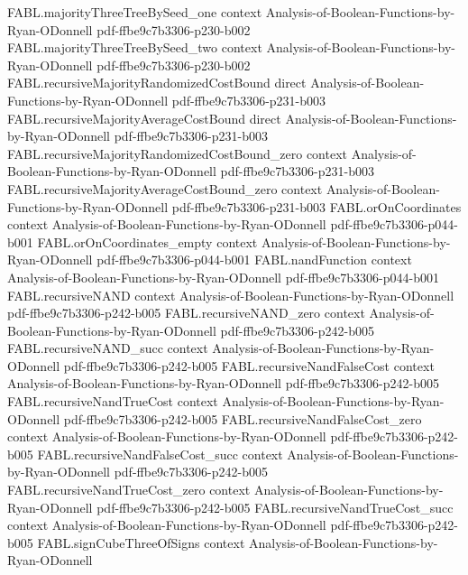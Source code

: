\begin{theorem}
  {FABL.majorityThreeTreeBySeed_one}
  {context}
  {Analysis-of-Boolean-Functions-by-Ryan-ODonnell}
  {pdf-ffbe9c7b3306-p230-b002}
\proofstep
  {FABL.majorityThreeTreeBySeed_two}
  {context}
  {Analysis-of-Boolean-Functions-by-Ryan-ODonnell}
  {pdf-ffbe9c7b3306-p230-b002}
\proofstep
  {FABL.recursiveMajorityRandomizedCostBound}
  {direct}
  {Analysis-of-Boolean-Functions-by-Ryan-ODonnell}
  {pdf-ffbe9c7b3306-p231-b003}
\proofstep
  {FABL.recursiveMajorityAverageCostBound}
  {direct}
  {Analysis-of-Boolean-Functions-by-Ryan-ODonnell}
  {pdf-ffbe9c7b3306-p231-b003}
\proofstep
  {FABL.recursiveMajorityRandomizedCostBound_zero}
  {context}
  {Analysis-of-Boolean-Functions-by-Ryan-ODonnell}
  {pdf-ffbe9c7b3306-p231-b003}
\proofstep
  {FABL.recursiveMajorityAverageCostBound_zero}
  {context}
  {Analysis-of-Boolean-Functions-by-Ryan-ODonnell}
  {pdf-ffbe9c7b3306-p231-b003}
\proofstep
  {FABL.orOnCoordinates}
  {context}
  {Analysis-of-Boolean-Functions-by-Ryan-ODonnell}
  {pdf-ffbe9c7b3306-p044-b001}
\proofstep
  {FABL.orOnCoordinates_empty}
  {context}
  {Analysis-of-Boolean-Functions-by-Ryan-ODonnell}
  {pdf-ffbe9c7b3306-p044-b001}
\proofstep
  {FABL.nandFunction}
  {context}
  {Analysis-of-Boolean-Functions-by-Ryan-ODonnell}
  {pdf-ffbe9c7b3306-p044-b001}
\proofstep
  {FABL.recursiveNAND}
  {context}
  {Analysis-of-Boolean-Functions-by-Ryan-ODonnell}
  {pdf-ffbe9c7b3306-p242-b005}
\proofstep
  {FABL.recursiveNAND_zero}
  {context}
  {Analysis-of-Boolean-Functions-by-Ryan-ODonnell}
  {pdf-ffbe9c7b3306-p242-b005}
\proofstep
  {FABL.recursiveNAND_succ}
  {context}
  {Analysis-of-Boolean-Functions-by-Ryan-ODonnell}
  {pdf-ffbe9c7b3306-p242-b005}
\proofstep
  {FABL.recursiveNandFalseCost}
  {context}
  {Analysis-of-Boolean-Functions-by-Ryan-ODonnell}
  {pdf-ffbe9c7b3306-p242-b005}
\proofstep
  {FABL.recursiveNandTrueCost}
  {context}
  {Analysis-of-Boolean-Functions-by-Ryan-ODonnell}
  {pdf-ffbe9c7b3306-p242-b005}
\proofstep
  {FABL.recursiveNandFalseCost_zero}
  {context}
  {Analysis-of-Boolean-Functions-by-Ryan-ODonnell}
  {pdf-ffbe9c7b3306-p242-b005}
\proofstep
  {FABL.recursiveNandFalseCost_succ}
  {context}
  {Analysis-of-Boolean-Functions-by-Ryan-ODonnell}
  {pdf-ffbe9c7b3306-p242-b005}
\proofstep
  {FABL.recursiveNandTrueCost_zero}
  {context}
  {Analysis-of-Boolean-Functions-by-Ryan-ODonnell}
  {pdf-ffbe9c7b3306-p242-b005}
\proofstep
  {FABL.recursiveNandTrueCost_succ}
  {context}
  {Analysis-of-Boolean-Functions-by-Ryan-ODonnell}
  {pdf-ffbe9c7b3306-p242-b005}
\proofstep
  {FABL.signCubeThreeOfSigns}
  {context}
  {Analysis-of-Boolean-Functions-by-Ryan-ODonnell}

\end{theorem}
